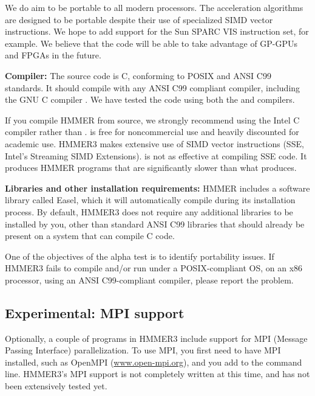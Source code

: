 We do aim to be portable to all modern processors. The acceleration
algorithms are designed to be portable despite their use of
specialized SIMD vector instructions. We hope to add support for the
Sun SPARC VIS instruction set, for example. We believe that the code
will be able to take advantage of GP-GPUs and FPGAs in the future.

\textbf{Compiler:} The source code is C, conforming to POSIX and ANSI
C99 standards. It should compile with any ANSI C99 compliant compiler,
including the GNU C compiler . We have tested the code
using both the  and  compilers.

If you compile HMMER from source, we strongly recommend using the
Intel C compiler  rather than .  is free
for noncommercial use and heavily discounted for academic use.  HMMER3
makes extensive use of SIMD vector instructions (SSE, Intel's
Streaming SIMD Extensions).  is not as effective at
compiling SSE code. It produces HMMER programs that are significantly
slower than what  produces.

\textbf{Libraries and other installation requirements:} HMMER includes
a software library called Easel, which it will automatically compile
during its installation process.  By default, HMMER3 does not require
any additional libraries to be installed by you, other than standard
ANSI C99 libraries that should already be present on a system that can
compile C code.

\begin{sidebar}
One of the objectives of the alpha test is to identify portability
issues. If HMMER3 fails to compile and/or run under a POSIX-compliant
OS, on an x86 processor, using an ANSI C99-compliant compiler, please
report the problem.
\end{sidebar}


\subsection{Experimental: MPI support}

Optionally, a couple of programs in HMMER3 include support for MPI
(Message Passing Interface) parallelization. To use MPI, you first
need to have MPI installed, such as OpenMPI (\url{www.open-mpi.org}),
and you add  to the  command
line. HMMER3's MPI support is not completely written at this time, and
has not been extensively tested yet. 

